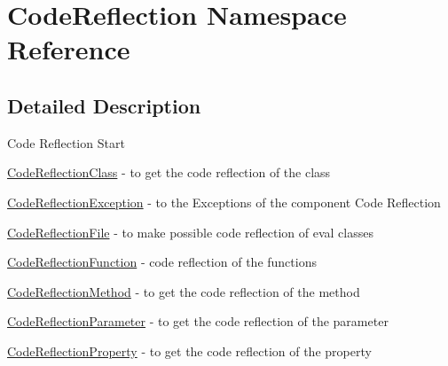 \hypertarget{namespace_code_reflection}{
\section{CodeReflection Namespace Reference}
\label{namespace_code_reflection}
}


\subsection{Detailed Description}
Code Reflection Start

\hyperlink{class_code_reflection_class}{CodeReflectionClass} - to get the code reflection of the class

\hyperlink{class_code_reflection_exception}{CodeReflectionException} - to the Exceptions of the component Code Reflection

\hyperlink{class_code_reflection_file}{CodeReflectionFile} - to make possible code reflection of eval classes

\hyperlink{class_code_reflection_function}{CodeReflectionFunction} - code reflection of the functions

\hyperlink{class_code_reflection_method}{CodeReflectionMethod} - to get the code reflection of the method

\hyperlink{class_code_reflection_parameter}{CodeReflectionParameter} - to get the code reflection of the parameter

\hyperlink{class_code_reflection_property}{CodeReflectionProperty} - to get the code reflection of the property 


